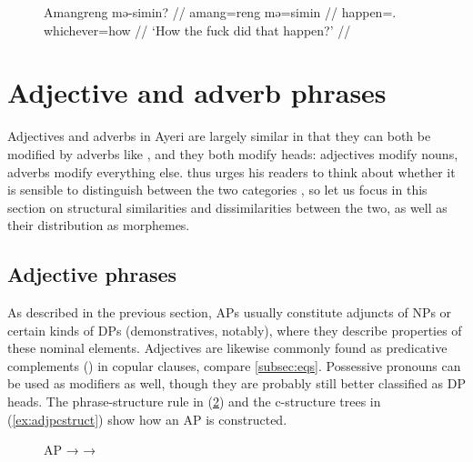\begin{figure}
\ex\label{ex:meinter}\begingl
	\gla Amangreng mə-simin? //
	\glb amang=reng mə=simin //
	\glc happen=\TsgI{}.\Aarg{} whichever=how //
	\glft `How the fuck did that happen?' //
\endgl\xe
\end{figure}


\section{Adjective and adverb phrases}
\label{sec:adjps-advps}

Adjectives and adverbs in Ayeri are largely similar in that they can both be
modified by adverbs like , and they both modify heads: adjectives
modify nouns, adverbs modify everything else. \citet{carnie2013} thus urges his
readers to think about whether it is sensible to distinguish between the two
categories \citep[51]{carnie2013}, so let us focus in this section on
structural similarities and dissimilarities between the two, as well as their
distribution as morphemes.

\subsection{Adjective phrases}
\label{subsec:adjps}

As described in the previous section, APs usually constitute adjuncts of NPs or
certain kinds of DPs (demonstratives, notably), where they describe properties
of these nominal elements. Adjectives are likewise commonly found as
predicative complements (\Plink{}) in copular clauses, compare
\autoref{subsec:eqs}. Possessive pronouns can be used as modifiers as well,
though they are probably still better classified as DP heads. The
phrase-structure rule in (\ref{ex:adjpstruct}) and the c-structure trees in
(\ref{ex:adjpcstruct}) show how an AP is constructed.

\begin{figure}
\pex\label{ex:adjpstruct}
\a AP →  
\a {} →  
\xe
\end{figure}

